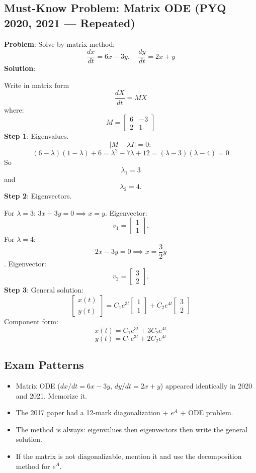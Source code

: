 \documentclass[
]{article}
\providecommand{\tightlist}{%
  \setlength{\itemsep}{0pt}\setlength{\parskip}{0pt}}
\begin{document}
\subsection{Must-Know Problem: Matrix ODE (PYQ 2020, 2021 ---
Repeated)}\label{must-know-problem-matrix-ode-pyq-2020-2021-repeated}

\textbf{Problem}: Solve by matrix method:
\[
\frac{dx}{dt} = 6x - 3y, \quad \frac{dy}{dt} = 2x + y
\]
\textbf{Solution}:

Write in matrix form
\[
\frac{dX}{dt} = MX
\]
where:
\[
M =
\begin{bmatrix}
6 & -3 \\
2 & 1
\end{bmatrix}
\]
\textbf{Step 1}: Eigenvalues.
\[
\lvert M - \lambda I \rvert = 0:
\]
\[
(6-\lambda)(1-\lambda) + 6 = \lambda^2 - 7\lambda + 12 = (\lambda - 3)(\lambda - 4) = 0
\]
So
\[
\lambda_1 = 3
\]
and
\[
\lambda_2 = 4.
\]
\textbf{Step 2}: Eigenvectors.

For \(\lambda = 3\): \(3x - 3y = 0 \implies x = y\). Eigenvector:
\[
v_1 =
\begin{bmatrix}
1 \\
1
\end{bmatrix}.
\]
For \(\lambda = 4\):
\[
2x - 3y = 0 \implies x = \frac{3}{2}y
\]
. Eigenvector:
\[
v_2 =
\begin{bmatrix}
3 \\
2
\end{bmatrix}.
\]
\textbf{Step 3}: General solution:
\[
\begin{bmatrix}
x(t) \\
y(t)
\end{bmatrix} = C_1 e^{3t}\begin{bmatrix} 1 \\ 1 \end{bmatrix} + C_2 e^{4t}\begin{bmatrix} 3 \\ 2 \end{bmatrix}
\]
Component form:
\[
x(t) = C_1 e^{3t} + 3C_2 e^{4t}
\]
\[
y(t) = C_1 e^{3t} + 2C_2 e^{4t}
\]

\subsection{Exam Patterns}\label{exam-patterns-28}

\begin{itemize}
\tightlist
\item
  Matrix ODE (\(dx/dt = 6x - 3y\), \(dy/dt = 2x + y\)) appeared
  identically in 2020 and 2021. Memorize it.
\item
  The 2017 paper had a 12-mark diagonalization + \(e^A\) + ODE problem.
\item
  The method is always: eigenvalues then eigenvectors then write the
  general solution.
\item
  If the matrix is not diagonalizable, mention it and use the
  decomposition method for \(e^A\).
\end{itemize}
\end{document}
